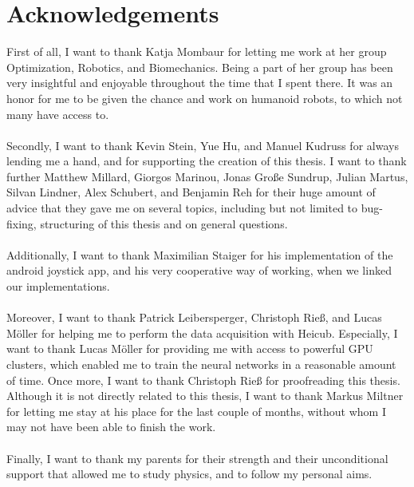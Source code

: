 \chapter{Acknowledgements}
First of all, I want to thank Katja Mombaur for letting me work at her group Optimization, Robotics, and Biomechanics. Being a part of her group has been very insightful and enjoyable throughout the time that I spent there. It was an honor for me to be given the chance and work on humanoid robots, to which not many have access to.\\\\
Secondly, I want to thank Kevin Stein, Yue Hu, and Manuel Kudruss for always lending me a hand, and for supporting the creation of this thesis. I want to thank further Matthew Millard, Giorgos Marinou, Jonas Große Sundrup, Julian Martus, Silvan Lindner, Alex Schubert, and Benjamin Reh for their huge amount of advice that they gave me on several topics, including but not limited to bug-fixing, structuring of this thesis and on general questions. \\\\Additionally, I want to thank Maximilian Staiger for his implementation of the android joystick app, and his very cooperative way of working, when we linked our implementations.\\\\ Moreover, I want to thank Patrick Leibersperger, Christoph Rieß, and Lucas Möller for helping me to perform the data acquisition with Heicub. Especially, I want to thank Lucas Möller for providing me with access to powerful GPU clusters, which enabled me to train the neural networks in a reasonable amount of time. Once more, I want to thank Christoph Rieß for proofreading this thesis. Although it is not directly related to this thesis, I want to thank Markus Miltner for letting me stay at his place for the last couple of months, without whom I may not have been able to finish the work.\\\\
Finally, I want to thank my parents for their strength and their unconditional support that allowed me to study physics, and to follow my personal aims.
